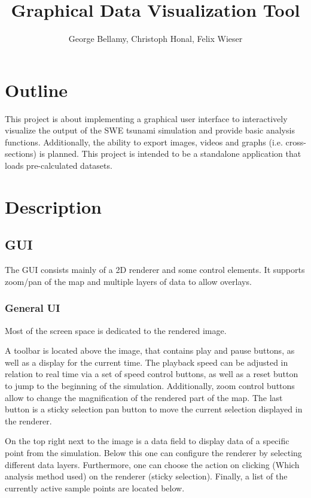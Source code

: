 \documentclass[paper=a4]{proc}
\title{Graphical Data Visualization Tool}
\author{George Bellamy, Christoph Honal, Felix Wieser}
\begin{document}
	\maketitle
	\thispagestyle{plain}	%
	\section{Outline}
		This project is about implementing a graphical user interface to interactively visualize the output of the SWE tsunami simulation and provide basic analysis functions. Additionally, the ability to export images, videos and graphs (i.e. cross-sections) is planned. This project is intended to be a standalone application that loads pre-calculated datasets.
	\section{Description}
		\subsection{GUI}
			The GUI consists mainly of a 2D renderer and some control elements. It  supports zoom/pan of the map and multiple layers of data to allow overlays.
			\subsubsection{General UI}
			Most of the screen space is dedicated to the rendered image.
			
			A toolbar is located above the image, that contains play and pause buttons, as well as a display for the current time. The playback speed can be adjusted in relation to real time via a set of speed control buttons, as well as a reset button to jump to the beginning of the simulation. Additionally, zoom control buttons allow to change the magnification of the rendered part of the map. The last button is a sticky selection pan button to move the current selection displayed in the renderer.
			
			On the top right next to the image is a data field to display data of a specific point from the simulation. Below this one can configure the renderer by selecting different data layers. Furthermore, one can choose the action on clicking (Which analysis method used) on the renderer (sticky selection). Finally, a list of the currently active sample points are located below.
			
\end{document}
